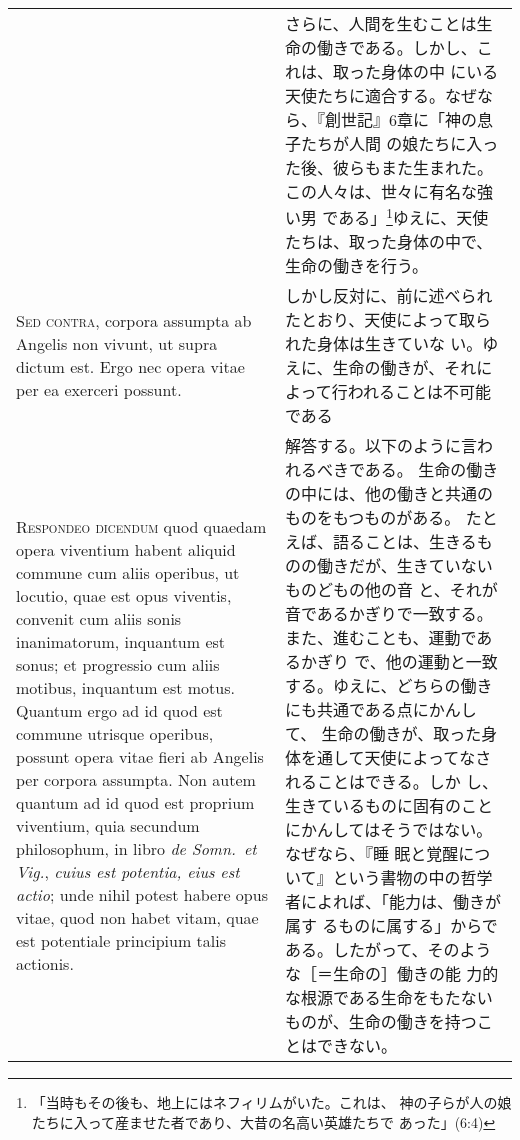 \documentclass[10pt]{jsarticle} %
\begin{document}
\begin{longtable}{p{21em}p{21em}}
&

さらに、人間を生むことは生命の働きである。しかし、これは、取った身体の中
 にいる天使たちに適合する。なぜなら、『創世記』6章に「神の息子たちが人間
 の娘たちに入った後、彼らもまた生まれた。この人々は、世々に有名な強い男
 である」\footnote{「当時もその後も、地上にはネフィリムがいた。これは、
 神の子らが人の娘たちに入って産ませた者であり、大昔の名高い英雄たちで
 あった」(6:4)}ゆえに、天使たちは、取った身体の中で、生命の働きを行う。
\\



{\scshape Sed contra}, corpora assumpta ab Angelis non
vivunt, ut supra dictum est. Ergo nec opera vitae per ea exerceri
possunt.
&

しかし反対に、前に述べられたとおり、天使によって取られた身体は生きていな
 い。ゆえに、生命の働きが、それによって行われることは不可能である
\\



{\scshape Respondeo dicendum} quod quaedam opera viventium habent
aliquid commune cum aliis operibus, ut locutio, quae est opus viventis,
convenit cum aliis sonis inanimatorum, inquantum est sonus; et
progressio cum aliis motibus, inquantum est motus. Quantum ergo ad id
quod est commune utrisque operibus, possunt opera vitae fieri ab Angelis
per corpora assumpta. Non autem quantum ad id quod est proprium
viventium, quia secundum philosophum, in libro {\itshape de Somn.~et
Vig.}, {\itshape cuius est potentia, eius est actio}; unde nihil potest
habere opus vitae, quod non habet vitam, quae est potentiale principium
talis actionis. 

&

解答する。以下のように言われるべきである。
生命の働きの中には、他の働きと共通のものをもつものがある。
たとえば、語ることは、生きるものの働きだが、生きていないものどもの他の音
 と、それが音であるかぎりで一致する。また、進むことも、運動であるかぎり
 で、他の運動と一致する。ゆえに、どちらの働きにも共通である点にかんして、
 生命の働きが、取った身体を通して天使によってなされることはできる。しか
 し、生きているものに固有のことにかんしてはそうではない。なぜなら、『睡
 眠と覚醒について』という書物の中の哲学者によれば、「能力は、働きが属す
 るものに属する」からである。したがって、そのような［＝生命の］働きの能
 力的な根源である生命をもたないものが、生命の働きを持つことはできない。


\\




\end{longtable}
\end{document}
